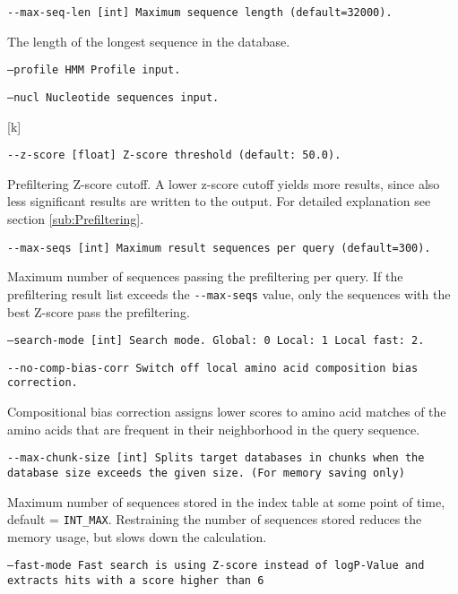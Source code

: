 \documentclass[11pt,a4paper]{scrreprt}
\begin{document}
\texttt{\small -{}-max-seq-len {[}int{]} Maximum sequence length (default=32000).}{\small \par}


The length of the longest sequence in the database.


\texttt{\small --profile HMM Profile input.}{\small \par}


\texttt{\small --nucl Nucleotide sequences input.}{\small \par}[k]


\texttt{\small -{}-z-score {[}float{]} Z-score threshold (default: 50.0).}{\small \par}


Prefiltering Z-score cutoff. A lower z-score cutoff yields more results, since also less significant results are written to the output. For detailed explanation see section \ref{sub:Prefiltering}.


\texttt{\small -{}-max-seqs {[}int{]} Maximum result sequences per query (default=300).}{\small \par}


Maximum number of sequences passing the prefiltering per query. If the prefiltering result list exceeds the \texttt{-{}-max-seqs} value, only the sequences with the best Z-score pass the prefiltering.


\texttt{\small --search-mode {[}int{]}  Search mode. Global: 0 Local: 1 Local fast: 2.}{\small \par}


\texttt{\small -{}-no-comp-bias-corr Switch off local amino acid composition bias correction.}{\small \par}


Compositional bias correction assigns lower scores to amino acid matches of the amino acids that are frequent in their neighborhood in the query sequence.


\texttt{\small -{}-max-chunk-size {[}int{]} Splits target databases in chunks when the database size exceeds the given size. (For memory saving only)}{\small \par}


Maximum number of sequences stored in the index table at some point of time, default = \texttt{INT\_MAX}. Restraining the number of sequences stored reduces the memory usage, but slows down the calculation.


\texttt{\small --fast-mode Fast search is using Z-score instead of logP-Value and extracts hits with a score higher than 6}{\small \par}
 
\end{document}
